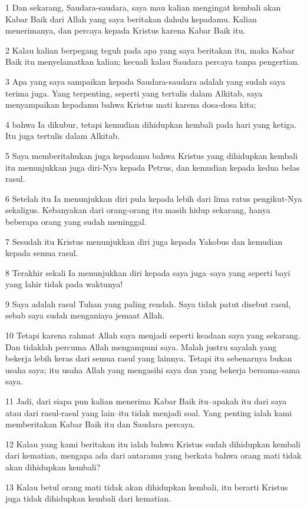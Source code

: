 \par 1 Dan sekarang, Saudara-saudara, saya mau kalian mengingat kembali akan Kabar Baik dari Allah yang saya beritakan dahulu kepadamu. Kalian menerimanya, dan percaya kepada Kristus karena Kabar Baik itu.
\par 2 Kalau kalian berpegang teguh pada apa yang saya beritakan itu, maka Kabar Baik itu menyelamatkan kalian; kecuali kalau Saudara percaya tanpa pengertian.
\par 3 Apa yang saya sampaikan kepada Saudara-saudara adalah yang sudah saya terima juga. Yang terpenting, seperti yang tertulis dalam Alkitab, saya menyampaikan kepadamu bahwa Kristus mati karena dosa-dosa kita;
\par 4 bahwa Ia dikubur, tetapi kemudian dihidupkan kembali pada hari yang ketiga. Itu juga tertulis dalam Alkitab.
\par 5 Saya memberitahukan juga kepadamu bahwa Kristus yang dihidupkan kembali itu menunjukkan juga diri-Nya kepada Petrus, dan kemudian kepada kedua belas rasul.
\par 6 Setelah itu Ia menunjukkan diri pula kepada lebih dari lima ratus pengikut-Nya sekaligus. Kebanyakan dari orang-orang itu masih hidup sekarang, hanya beberapa orang yang sudah meninggal.
\par 7 Sesudah itu Kristus menunjukkan diri juga kepada Yakobus dan kemudian kepada semua rasul.
\par 8 Terakhir sekali Ia menunjukkan diri kepada saya juga--saya yang seperti bayi yang lahir tidak pada waktunya!
\par 9 Saya adalah rasul Tuhan yang paling rendah. Saya tidak patut disebut rasul, sebab saya sudah menganiaya jemaat Allah.
\par 10 Tetapi karena rahmat Allah saya menjadi seperti keadaan saya yang sekarang. Dan tidaklah percuma Allah mengampuni saya. Malah justru sayalah yang bekerja lebih keras dari semua rasul yang lainnya. Tetapi itu sebenarnya bukan usaha saya; itu usaha Allah yang mengasihi saya dan yang bekerja bersama-sama saya.
\par 11 Jadi, dari siapa pun kalian menerima Kabar Baik itu--apakah itu dari saya atau dari rasul-rasul yang lain--itu tidak menjadi soal. Yang penting ialah kami memberitakan Kabar Baik itu dan Saudara percaya.
\par 12 Kalau yang kami beritakan itu ialah bahwa Kristus sudah dihidupkan kembali dari kematian, mengapa ada dari antaramu yang berkata bahwa orang mati tidak akan dihidupkan kembali?
\par 13 Kalau betul orang mati tidak akan dihidupkan kembali, itu berarti Kristus juga tidak dihidupkan kembali dari kematian.

